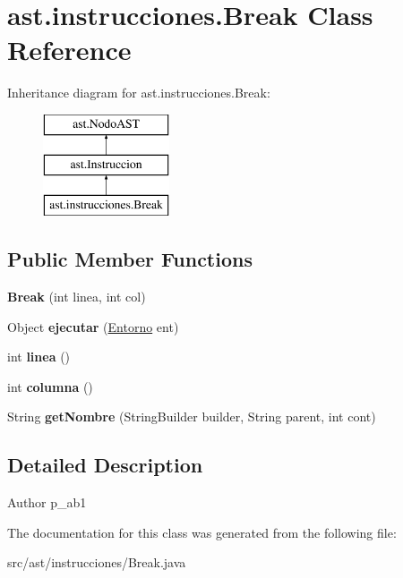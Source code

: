 \hypertarget{classast_1_1instrucciones_1_1_break}{}\section{ast.\+instrucciones.\+Break Class Reference}
\label{classast_1_1instrucciones_1_1_break}
Inheritance diagram for ast.\+instrucciones.\+Break\+:\begin{figure}[H]
\begin{center}
\leavevmode
\includegraphics[height=3.000000cm]{classast_1_1instrucciones_1_1_break}
\end{center}
\end{figure}
\subsection*{Public Member Functions}
\begin{DoxyCompactItemize}
\item 
\mbox{\label{classast_1_1instrucciones_1_1_break_a5cf514c19c9c87dad49ce5e21035e9ab}} 
{\bfseries Break} (int linea, int col)
\item 
\mbox{\label{classast_1_1instrucciones_1_1_break_a7d018447eda1feae75640013de6acb70}} 
Object {\bfseries ejecutar} (\mbox{\hyperlink{classentorno_1_1_entorno}{Entorno}} ent)
\item 
\mbox{\label{classast_1_1instrucciones_1_1_break_a15d547f54c9a2ad34aaaa73dbec08ae8}} 
int {\bfseries linea} ()
\item 
\mbox{\label{classast_1_1instrucciones_1_1_break_a2bd8cf63d79ecf73d4718020276090eb}} 
int {\bfseries columna} ()
\item 
\mbox{\label{classast_1_1instrucciones_1_1_break_a96d3cb843c1b32146dbcbfd280ccef97}} 
String {\bfseries get\+Nombre} (String\+Builder builder, String parent, int cont)
\end{DoxyCompactItemize}


\subsection{Detailed Description}
\begin{DoxyAuthor}{Author}
p\+\_\+ab1 
\end{DoxyAuthor}


The documentation for this class was generated from the following file\+:\begin{DoxyCompactItemize}
\item 
src/ast/instrucciones/Break.\+java\end{DoxyCompactItemize}
